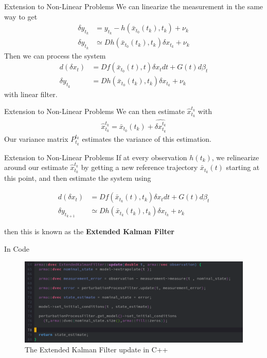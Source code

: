 \documentclass{beamer}
\begin{document}
\begin{frame}{Extension to Non-Linear Problems}
  We can linearize the measurement in the same way to get
  \begin{align}
    \delta y_{t_k} &= y_{t_k} - h(\bar{x}_{t_0}(t_k), t_k) + \nu_k \\
    \delta y_{t_k} &\simeq Dh(\bar{x}_{t_0}(t_k),t_k) \delta x_{t_k} + \nu_k
  \end{align}
  \pause
  Then we can process the system
  \begin{align}
    d(\delta x_t) &= Df(\bar{x}_{t_0}(t),t) \delta x_t dt + G(t) d\beta_t \\
    \delta y_{t_k} & = Dh(\bar{x}_{t_0}(t_k),t_k) \delta x_{t_k} + \nu_k
  \end{align}
  with  linear filter.
\end{frame}

\begin{frame}{Extension to Non-Linear Problems}
  We can then estimate $\hat{x}_{t_k}^{t_k}$ with
  \begin{align}
    \hat{x}_{t_k}^{t_k} = \bar{x}_{t_0}(t_k) + \hat{\delta x_{t_k}^{t_k}}
  \end{align}
  Our variance matrix $P_{t_k}^{t_k}$ estimates the variance of this
  estimation.
\end{frame}

\begin{frame}{Extension to Non-Linear Problems}
  If at every observation $h(t_k)$, we relinearize around our estimate
  $\hat{x}_{t_k}^{t_k}$ by getting a new reference trajectory $\bar{x}_{t_k}(t)$
  starting at this point, and then estimate the system using

  
  \begin{align}
    d(\delta x_t) &= Df(\bar{x}_{t_k}(t),t_k) \delta x_t dt + G(t) d\beta_t \\
    \delta y_{t_{k+1}} &\simeq Dh(\bar{x}_{t_k}(t_k),t_k) \delta x_{t_k} + \nu_k
  \end{align}

  then this is known as the \textbf{Extended Kalman Filter}
\end{frame}

\begin{frame}{In Code}

\begin{figure}
  \includegraphics[scale=0.3]{ekf_implementation.png}
  \caption{The Extended Kalman Filter update in C++}

\end{figure}
\end{frame}
\end{document}
